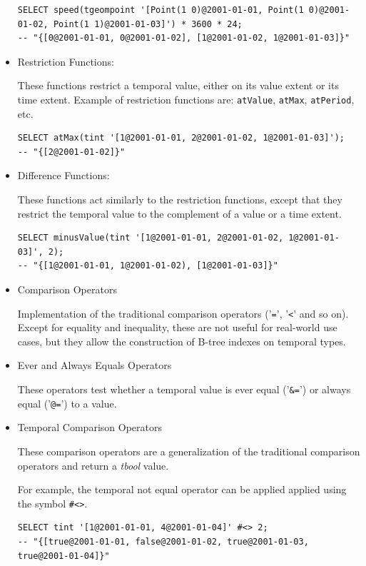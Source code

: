 \begin{itemize}
        \begin{lstlisting}
SELECT speed(tgeompoint '[Point(1 0)@2001-01-01, Point(1 0)@2001-01-02, Point(1 1)@2001-01-03]') * 3600 * 24;
-- "{[0@2001-01-01, 0@2001-01-02], [1@2001-01-02, 1@2001-01-03]}"
        \end{lstlisting}

    \item Restriction Functions:

        These functions restrict a temporal value, either on its value extent or its time extent.
        Example of restriction functions are: \lstinline{atValue}, \lstinline{atMax}, \lstinline{atPeriod}, etc.

        \begin{lstlisting}
SELECT atMax(tint '[1@2001-01-01, 2@2001-01-02, 1@2001-01-03]');
-- "{[2@2001-01-02]}"
        \end{lstlisting}

    \item Difference Functions:

        These functions act similarly to the restriction functions, except that they restrict the temporal value to the complement of a value or a time extent.

        \begin{lstlisting}
SELECT minusValue(tint '[1@2001-01-01, 2@2001-01-02, 1@2001-01-03]', 2);
-- "{[1@2001-01-01, 1@2001-01-02), [1@2001-01-03]}"
        \end{lstlisting}

    \item Comparison Operators

        Implementation of the traditional comparison operators ('\lstinline+=+', '\lstinline+<+' and so on). Except for equality and inequality, these are not useful for real-world use cases, but they allow the construction of B-tree indexes on temporal types. 

    \item Ever and Always Equals Operators

        These operators test whether a temporal value is ever equal ('\lstinline+&=+') or always equal ('\lstinline+@=+') to a value.

    \item Temporal Comparison Operators

        These comparison operators are a generalization of the traditional comparison operators and return a \textit{tbool} value.

        For example, the temporal not equal operator can be applied applied using the symbol \lstinline{#<>}.
        \begin{lstlisting}
SELECT tint '[1@2001-01-01, 4@2001-01-04]' #<> 2;
-- "{[true@2001-01-01, false@2001-01-02, true@2001-01-03, true@2001-01-04]}"
        \end{lstlisting}


\end{itemize}
